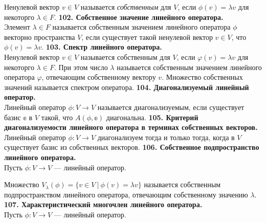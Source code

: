 \documentclass{article}
\begin{document}
Ненулевой вектор $v\in V$ называется \textit{собственным} для $V$, если $\phi(v) = \lambda v$ для некоторго $\lambda \in F$.
\newline
\newline
\textbf{102. Собственное значение линейного оператора.}\\
Элемент $\lambda \in F$ называется собственным значением линейного оператора $\phi$ векторно пространства $V$, если существует такой ненулевой вектор $v \in V$, что $\phi(v) =\lambda v$. 
\newline
\newline
\textbf{103. Спектр линейного оператора.} \\
   Ненулевой вектор $v \in V$ называется собственным для $V$, если $\varphi(v) = \lambda v$ для некоторго $\lambda \in F$. При этом число $\lambda$ называется собственным значением линейного оператора $\varphi$, отвечающим собственному вектору $v$. Множество собственных значений называется спектром оператора.
\newline
\newline
\textbf{104. Диагонализуемый линейный оператор.}\\
Линейный оператор $\phi\colon V \rightarrow V$ называется диагонализуемым, если существует базис $\mathbb{e}$ в $V$ такой, что $A(\phi, \mathbb{e})$ диагональна. 
\newline
\newline
\textbf{105. Критерий диагонализуемости линейного оператора в терминах собственных векторов.}\\
Линейный оператор $\phi\colon V \rightarrow V$ диагонализуем тогда и только тогда, когда в $V$ существует базис из собственных векторов.
\newline
\newline
\textbf{106. Собственное подпространство линейного оператора.}\\
Пусть $\phi\colon V \rightarrow V$ --- линейный оператор.

Множество $V_{\lambda}(\phi) = \{v\in V\ |\ \phi(v) = \lambda v\}$ называется собственным подпространством линейного оператора, отвечающим собственному значению $\lambda$.
\newline
\newline
\textbf{107. Характеристический многочлен линейного оператора.}\\
Пусть $\phi\colon V \rightarrow V$ --- линейный оператор.
\end{document}

